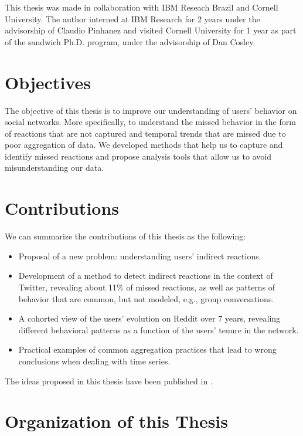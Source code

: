 This thesis was made in collaboration with IBM Reseach Brazil and Cornell University. The author interned at IBM Research for 2 years under the advisorship of Claudio Pinhanez and visited Cornell University for 1 year as part of the sandwich Ph.D. program, under the advisorship of Dan Cosley.

\section{Objectives}

The objective of this thesis is to improve our understanding of users' behavior on social networks. More specifically, to understand the missed behavior in the form of reactions that are not captured and temporal trends that are missed due to poor aggregation of data. We developed methods that help us to capture and identify missed reactions and propose analysis tools that allow us to avoid misunderstanding our data.

\section{Contributions}

We can summarize the contributions of this thesis as the following:

\begin{itemize}
	\item Proposal of a new problem: understanding users' indirect reactions.
	\item Development of a method to detect indirect reactions in the context of Twitter, revealing about 11\% of missed reactions, as well as patterns of behavior that are common, but not modeled, e.g., group conversations.
	\item A cohorted view of the users' evolution on Reddit over 7 years, revealing different behavioral patterns as a function of the users' tenure in the network.
	\item Practical examples of common aggregation practices that lead to wrong conclusions when dealing with time series.
\end{itemize}

The ideas proposed in this thesis have been published in \cite{BarbosaNeto2013, Barbosa, Barbosa2016}.

\section{Organization of this Thesis}

